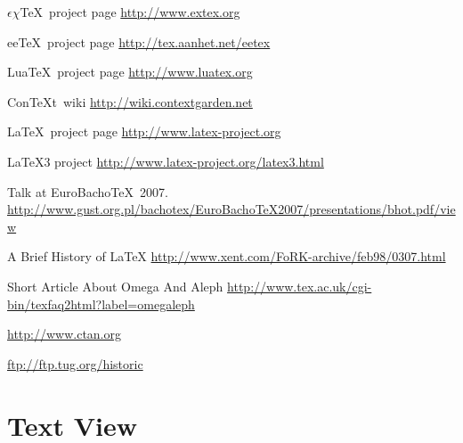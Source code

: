 \documentclass{scrartcl}
\def\ConTeXt{Con\TeX{}t}
\begin{document}
\begin{thebibliography}{10}
{$\epsilon\chi$\TeX\ project page}
\newblock \url{http://www.extex.org}

{ee\TeX\ project page}
\newblock \url{http://tex.aanhet.net/eetex}

{Lua\TeX\ project page}
\newblock \url{http://www.luatex.org}

\vspace{2ex}
\vspace{1ex}
\ConTeXt\ wiki
\newblock \url{http://wiki.contextgarden.net}

{\LaTeX\ project page}
\newblock \url{http://www.latex-project.org}

{\LaTeX3 project}
\newblock \url{http://www.latex-project.org/latex3.html}

\vspace{2ex}
\vspace{1ex}
\newblock Talk at EuroBacho\TeX\ 2007.\\
\newblock \url{http://www.gust.org.pl/bachotex/EuroBachoTeX2007/presentations/bhot.pdf/view}

{A Brief History of \LaTeX}
\newblock \url{http://www.xent.com/FoRK-archive/feb98/0307.html}

{Short Article About Omega And Aleph}
\newblock \url{http://www.tex.ac.uk/cgi-bin/texfaq2html?label=omegaleph}

\vspace{2ex}
\vspace{1ex}

\newblock \url{http://www.ctan.org}

\newblock \url{ftp://ftp.tug.org/historic}
\end{thebibliography}

\clearpage
\section{Text View}
\label{sec:text}
\end{document}
